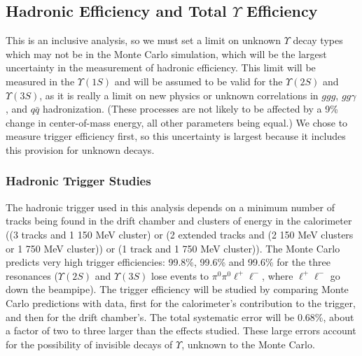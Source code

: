 \documentclass[aps,prd,preprint,superscriptaddress,tightenlines,nofootinbib,floatfix]{revtex4}
\begin{document}

%
\subsection{Hadronic Efficiency and Total $\Upsilon$ Efficiency}
%

This is an inclusive analysis, so we must set a limit on unknown
$\Upsilon$ decay types which may not be in the Monte Carlo simulation,
which will be the largest uncertainty in the measurement of hadronic
efficiency.  This limit will be measured in the $\Upsilon(1S)$ and
will be assumed to be valid for the $\Upsilon(2S)$ and $\Upsilon(3S)$,
as it is really a limit on new physics or unknown correlations in
$ggg$, $gg\gamma$, and $q\bar{q}$ hadronization.  (These processes are
not likely to be affected by a 9\% change in center-of-mass energy,
all other parameters being equal.)  We chose to measure trigger
efficiency first, so this uncertainty is largest because it includes
this provision for unknown decays.

%
\subsubsection{Hadronic Trigger Studies}
%

The hadronic trigger used in this analysis depends on a minimum number
of tracks being found in the drift chamber and clusters of energy in
the calorimeter ((3 tracks and 1 150 MeV cluster) or (2 extended
tracks and (2 150 MeV clusters or 1 750 MeV cluster)) or (1 track and
1 750 MeV cluster)).  The Monte Carlo predicts very high trigger
efficiencies: 99.8\%, 99.6\% and 99.6\% for the three resonances
($\Upsilon(2S)$ and $\Upsilon(3S)$ lose events to
$\pi^0\pi^0\ell^+\ell^-$, where $\ell^+\ell^-$ go down the beampipe).
The trigger efficiency will be studied by comparing Monte Carlo
predictions with data, first for the calorimeter's contribution to the
trigger, and then for the drift chamber's.  The total systematic error
will be 0.68\%, about a factor of two to three larger than the effects
studied.  These large errors account for the possibility of invisible
decays of $\Upsilon$, unknown to the Monte Carlo.
\end{document}
